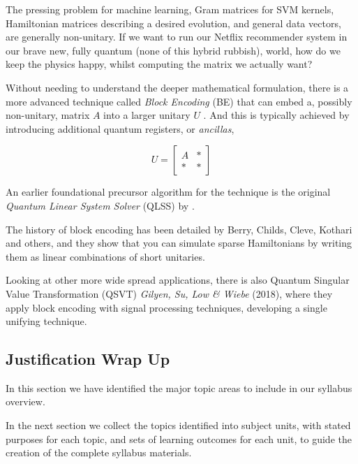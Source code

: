 The pressing problem for machine learning, Gram matrices for SVM kernels, 
Hamiltonian matrices describing a desired evolution, and general data vectors, are generally non-unitary.
If we want to run our Netflix recommender system in our brave new, fully quantum (none of this hybrid rubbish), world,
how do we keep the physics happy, whilst computing the matrix we actually want?

Without needing to understand the deeper mathematical formulation, 
there is a more advanced technique called \emph{Block Encoding} (BE) 
that can embed a, possibly non-unitary, matrix $A$ into a larger unitary $U$ \cite{Low:2017}.
And this is typically achieved by introducing additional quantum registers, or \emph{ancillas}, 

$$
U = \begin{bmatrix} A & \ast \\ \ast & \ast \end{bmatrix}
$$

An earlier foundational precursor algorithm for the technique is 
the original \emph{Quantum Linear System Solver} (QLSS) by \citeauthor{Harrow:2009} \cite{Harrow:2009}.

The history of block encoding has been detailed by Berry, Childs, Cleve, Kothari and others, 
and they show that you can simulate sparse Hamiltonians by writing them as linear combinations 
of short unitaries.

Looking at other more wide spread applications, 
there is also Quantum Singular Value Transformation (QSVT) \emph{Gilyen, Su, Low \& Wiebe} (2018),
where they apply block encoding with signal processing techniques, developing a single unifying technique.

\subsection{Justification Wrap Up}

In this section we have identified the major topic areas to include in our syllabus overview.

In the next section we collect the topics identified into subject units, with stated purposes for each topic,
and sets of learning outcomes for each unit, to guide the creation of the complete syllabus materials.